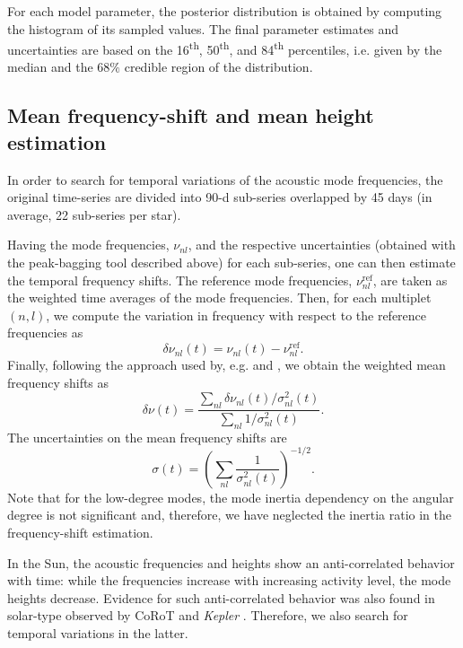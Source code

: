 \documentclass[twocolumn]{aastex61}%
\begin{document}
For each model parameter, the posterior distribution is obtained by computing the histogram of its sampled values. The final parameter estimates and uncertainties are based on the 16\textsuperscript{th}, 50\textsuperscript{th}, and 84\textsuperscript{th} percentiles, i.e. given by the median and the $68\%$ credible region of the distribution. 

\subsection{Mean frequency-shift and mean height estimation}\label{sec:fshifts}

In order to search for temporal variations of the acoustic mode frequencies, the original time-series are divided into 90-d sub-series overlapped by 45 days (in average, 22 sub-series per star).

Having the mode frequencies, $\nu_{nl}$, and the respective uncertainties (obtained with the peak-bagging tool described above) for each sub-series, one can then estimate the temporal frequency shifts. The reference mode frequencies, $\nu_{nl}^\text{ref}$, are taken as the weighted time averages of the mode frequencies. Then, for each multiplet $(n,l)$, we compute the variation in frequency with respect to the reference frequencies as 
\begin{equation}
\delta\nu_{nl}(t)=\nu_{nl}(t)-\nu_{nl}^\text{ref}.
\end{equation}
Finally, following the approach used by, e.g. \citet{Chaplin2007} and \citet{Tripathy2007}, we obtain the weighted mean frequency shifts as
\begin{equation}
\delta\nu(t)=\dfrac{\sum_{nl}\delta\nu_{nl}(t)/\sigma^2_{nl}(t)}{\sum_{nl}1/\sigma^2_{nl}(t)}.
\end{equation}
The uncertainties on the mean frequency shifts are
\begin{equation}
\sigma(t)=\left(\sum_{nl}\dfrac{1}{\sigma_{nl}^2(t)}\right)^{-1/2}.
\end{equation}
Note that for the low-degree modes, the mode inertia dependency on the angular degree is not significant \citep[e.g.][]{Chaplin2007} and, therefore, we have neglected the inertia ratio in the frequency-shift estimation.

In the Sun, the acoustic frequencies and heights show an anti-correlated behavior with time: while the frequencies increase with increasing activity level, the mode heights decrease. Evidence for such anti-correlated behavior was also found in solar-type observed by CoRoT and {\it Kepler} \citep{Garcia2014,Kiefer2017}. Therefore, we also search for temporal variations in the latter.
\end{document}
